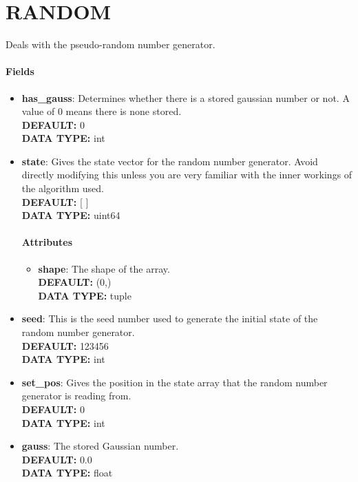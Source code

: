 \section{RANDOM}
\label{RANDOM}
Deals with the pseudo-random number generator.
\paragraph{Fields}
 \begin{itemize}
\item {\bf has\_gauss}:
 Determines whether there is a stored gaussian number or not. A value of 0 means there is none stored.
{\\ \bf DEFAULT: }0
{\\ \bf DATA TYPE: }int
\item {\bf state}:
 Gives the state vector for the random number generator. Avoid directly modifying this unless you are very familiar with the inner workings of the algorithm used.
{\\ \bf DEFAULT: }[ ]
{\\ \bf DATA TYPE: }uint64
\paragraph{Attributes}
 \begin{itemize}
\item {\bf shape}:
 The shape of the array.
{\\ \bf DEFAULT: }(0,)
{\\ \bf DATA TYPE: }tuple
\end{itemize}
 
\item {\bf seed}:
 This is the seed number used to generate the initial state of the random number generator.
{\\ \bf DEFAULT: }123456
{\\ \bf DATA TYPE: }int
\item {\bf set\_pos}:
 Gives the position in the state array that the random number generator is reading from.
{\\ \bf DEFAULT: }0
{\\ \bf DATA TYPE: }int
\item {\bf gauss}:
 The stored Gaussian number.
{\\ \bf DEFAULT: }0.0
{\\ \bf DATA TYPE: }float
\end{itemize}
 

